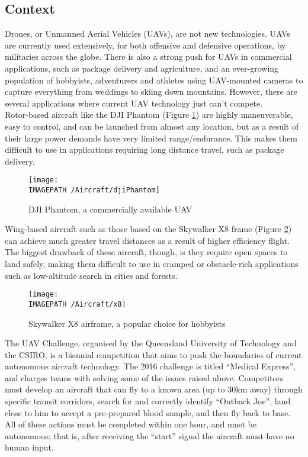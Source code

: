 \subsection{Context}
Drones, or Unmanned Aerial Vehicles (UAVs), are not new technologies. UAVs are currently used extensively, for both offensive\cite{ref:offence} and defensive\cite{ref:defence} operations, by militaries across the globe. There is also a strong push for UAVs in commercial applications, such as package delivery\cite{ref:package} and agriculture\cite{ref:agriculture}, and an ever-growing population of hobbyists\cite{ref:hobby}, adventurers\cite{ref:adventure} and athletes\cite{ref:sport} using UAV-mounted cameras to capture everything from weddings to skiing down mountains. However, there are several applications where current UAV technology just can't compete.\\

Rotor-based aircraft like the DJI Phantom (Figure \ref{fig:dji}) are highly maneuverable, easy to control, and can be launched from almost any location, but as a result of their large power demands have very limited range/endurance. This makes them difficult to use in applications requiring long distance travel, such as package delivery.

\begin{figure}[!h]
	\centering
	\texttt{[image: \\IMAGEPATH /Aircraft/djiPhantom]}
	\caption{DJI Phantom, a commercially available UAV}
	\label{fig:dji}
\end{figure}

Wing-based aircraft such as those based on the Skywalker X8 frame\cite{ref:x8} (Figure \ref{fig:x8}) can achieve much greater travel distances as a result of higher efficiency flight. The biggest drawback of these aircraft, though, is they require open spaces to land safely, making them difficult to use in cramped or obstacle-rich applications such as low-altitude search in cities and forests.

\begin{figure}[!h]
	\centering
	\texttt{[image: \\IMAGEPATH /Aircraft/x8]}
	\caption{Skywalker X8 airframe, a popular choice for hobbyists}
	\label{fig:x8}
\end{figure}
 
The UAV Challenge\cite{ref:challenge}, organised by the Queensland University of Technology and the CSIRO, is a biennial competition that aims to push the boundaries of current autonomous aircraft technology. The 2016 challenge is titled ``Medical Express'', and charges teams with solving some of the issues raised above. Competitors must develop an aircraft that can fly to a known area (up to 30km away) through specific transit corridors, search for and correctly identify ``Outback Joe'', land close to him to accept a pre-prepared blood sample, and then fly back to base. All of these actions must be completed within one hour, and must be autonomous; that is, after receiving the ``start'' signal the aircraft must have no human input.\\

